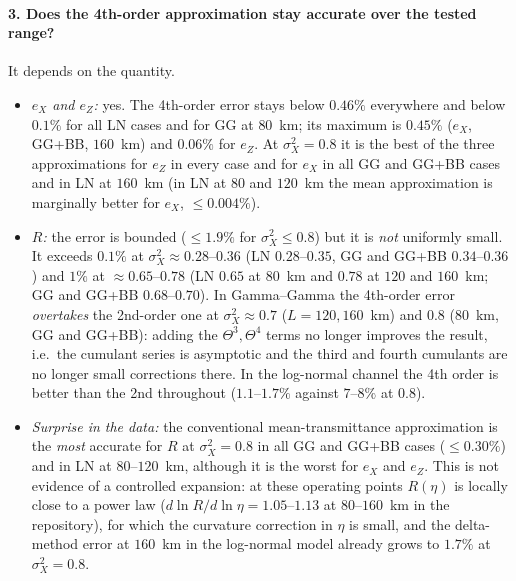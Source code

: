 \documentclass[11pt,a4paper]{article}
\begin{document}
\paragraph{3. Does the 4th-order approximation stay accurate over the tested range?}
It depends on the quantity.
\begin{itemize}
\item \emph{$e_X$ and $e_Z$:} yes. The 4th-order error stays below $0.46\%$ everywhere and below $0.1\%$ for all LN cases and for GG at $80$~km; its maximum is $0.45\%$ ($e_X$, GG+BB, $160$~km) and $0.06\%$ for $e_Z$. At $\sigma_X^2=0.8$ it is the best of the three approximations for $e_Z$ in every case and for $e_X$ in all GG and GG+BB cases and in LN at $160$~km (in LN at $80$ and $120$~km the mean approximation is marginally better for $e_X$, $\le0.004\%$).
\item \emph{$R$:} the error is bounded ($\le1.9\%$ for $\sigma_X^2\le0.8$) but it is \emph{not} uniformly small. It exceeds $0.1\%$ at $\sigma_X^2\approx0.28$--$0.36$ (LN $0.28$--$0.35$, GG and GG+BB $0.34$--$0.36$) and $1\%$ at $\approx0.65$--$0.78$ (LN $0.65$ at $80$~km and $0.78$ at $120$ and $160$~km; GG and GG+BB $0.68$--$0.70$). In Gamma--Gamma the 4th-order error \emph{overtakes} the 2nd-order one at $\sigma_X^2\approx0.7$ ($L=120,160$~km) and $0.8$ ($80$~km, GG and GG+BB): adding the $\Theta^3,\Theta^4$ terms no longer improves the result, i.e.\ the cumulant series is asymptotic and the third and fourth cumulants are no longer small corrections there. In the log-normal channel the 4th order is better than the 2nd throughout ($1.1$--$1.7\%$ against $7$--$8\%$ at $0.8$).
\item \emph{Surprise in the data:} the conventional mean-transmittance approximation is the \emph{most} accurate for $R$ at $\sigma_X^2=0.8$ in all GG and GG+BB cases ($\le0.30\%$) and in LN at $80$--$120$~km, although it is the worst for $e_X$ and $e_Z$. This is not evidence of a controlled expansion: at these operating points $R(\eta)$ is locally close to a power law ($d\ln R/d\ln\eta=1.05$--$1.13$ at $80$--$160$~km in the repository), for which the curvature correction in $\eta$ is small, and the delta-method error at $160$~km in the log-normal model already grows to $1.7\%$ at $\sigma_X^2=0.8$.
\end{itemize}
\end{document}
